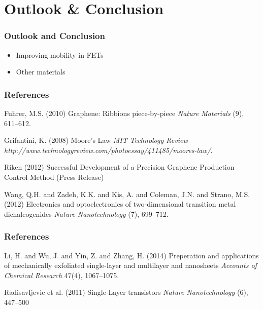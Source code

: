 \documentclass{beamer}
\begin{document}
\section{Outlook \& Conclusion}
\begin{frame}
\frametitle{Outlook and Conclusion}
\begin{itemize}
	\item Improving mobility in  FETs
	\item Other materials
\end{itemize}
\end{frame}

\begin{frame}
\frametitle{References}
\footnotesize{
	\begin{thebibliography}{99}
	 Fuhrer, M.S. (2010)
	\newblock  Graphene: Ribbions piece-by-piece
	\newblock \emph{Nature Materials} (9), 611--612.

	 Grifantini, K. (2008)
	\newblock Moore's Law
	\newblock \emph{MIT Technology Review} \emph{http://www.technologyreview.com/photoessay/411485/moores-law/}.

	 Riken (2012)
	\newblock Successful Development of a Precision Graphene Production Control Method (Press Release)

	 Wang, Q.H. and Zadeh, K.K. and Kis, A. and Coleman, J.N. and Strano, M.S. (2012)
	\newblock Electronics and optoelectronics of two-dimensional transition metal dichalcogenides
	\newblock \emph{Nature Nanotechnology} (7), 699--712.

	\end{thebibliography}
}
\end{frame}

\begin{frame}
\frametitle{References}
\footnotesize{
	\begin{thebibliography}{99}
	 Li, H. and Wu, J. and Yin, Z. and Zhang, H. (2014)
	\newblock Preperation and applications of mechanically exfoliated single-layer and multilayer  and  nanosheets
	\newblock \emph{Accounts of Chemical Research} 47(4), 1067--1075.

	 Radisavljevic et al. (2011)
	\newblock Single-Layer  transistors
	\newblock \emph{Nature Nanotechnology} (6), 447--500
	
	\end{thebibliography}
}
\end{frame}

\end{document}

